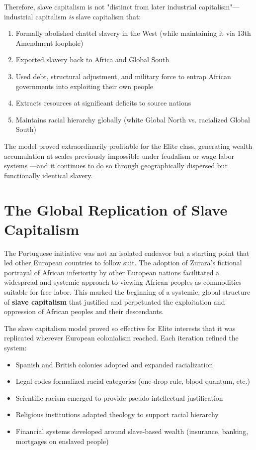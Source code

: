 \documentclass[12pt,openany]{book}
\begin{document}
Therefore, slave capitalism is not "distinct from later industrial capitalism"---industrial capitalism \textit{is} slave capitalism that:
\begin{enumerate}
    \item Formally abolished chattel slavery in the West (while maintaining it via 13th Amendment loophole)
    \item Exported slavery back to Africa and Global South
    \item Used debt, structural adjustment, and military force to entrap African governments into exploiting their own people
    \item Extracts resources at significant deficits to source nations
    \item Maintains racial hierarchy globally (white Global North vs. racialized Global South)
\end{enumerate}

The model proved extraordinarily profitable for the Elite class, generating wealth accumulation at scales previously impossible under feudalism or wage labor systems \cite{williams, robinson}---and it continues to do so through geographically dispersed but functionally identical slavery.

\section{The Global Replication of Slave Capitalism}

The Portuguese initiative was not an isolated endeavor but a starting point that led other European countries to follow suit. The adoption of Zurara's fictional portrayal of African inferiority by other European nations facilitated a widespread and systemic approach to viewing African peoples as commodities suitable for free labor. This marked the beginning of a systemic, global structure of \textbf{slave capitalism} that justified and perpetuated the exploitation and oppression of African peoples and their descendants.

The slave capitalism model proved so effective for Elite interests that it was replicated wherever European colonialism reached. Each iteration refined the system:
\begin{itemize}
    \item Spanish and British colonies adopted and expanded racialization
    \item Legal codes formalized racial categories (one-drop rule, blood quantum, etc.)
    \item Scientific racism emerged to provide pseudo-intellectual justification
    \item Religious institutions adapted theology to support racial hierarchy
    \item Financial systems developed around slave-based wealth (insurance, banking, mortgages on enslaved people) \cite{beckert, johnson}
\end{itemize}
\end{document}
